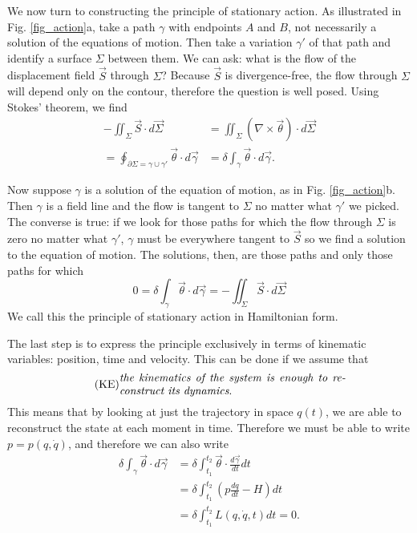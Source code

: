 \documentclass[fleqn,10pt]{wlscirep}
\begin{document}
We now turn to constructing the principle of stationary action. As illustrated in Fig. \ref{fig_action}a, take a path $\gamma$ with endpoints $A$ and $B$, not necessarily a solution of the equations of motion. Then take a variation $\gamma'$ of that path and identify a surface $\Sigma$ between them. We can ask: what is the flow of the displacement field $\vec{S}$ through $\Sigma$? Because $\vec{S}$ is divergence-free, the flow through $\Sigma$ will depend only on the contour, therefore the question is well posed. Using Stokes' theorem, we find
\begin{equation}\label{sdof_action}
\begin{aligned}
	- \iint_{\Sigma} \vec{S} \cdot d\vec{\Sigma} &= \iint_{\Sigma} \left( \nabla \times \vec{\theta} \right) \cdot d\vec{\Sigma} \\
	=  \oint_{\partial \Sigma = \gamma \cup \gamma'} \vec{\theta}  \cdot d\vec{\gamma} 
	&= \delta \int_{\gamma} \vec{\theta} \cdot d\vec{\gamma}.
\end{aligned}
\end{equation}

Now suppose $\gamma$ is a solution of the equation of motion, as in Fig. \ref{fig_action}b. Then $\gamma$ is a field line and the flow is tangent to $\Sigma$ no matter what $\gamma'$ we picked. The converse is true: if we look for those paths for which the flow through $\Sigma$ is zero no matter what $\gamma'$, $\gamma$ must be everywhere tangent to $\vec{S}$ so we find a solution to the equation of motion. The solutions, then, are those paths and only those paths for which
\begin{equation}\label{sdof_stationary_action}
	0 =\delta \int_{\gamma} \vec{\theta} \cdot d\vec{\gamma} = - \iint_{\Sigma} \vec{S} \cdot d\vec{\Sigma} 
\end{equation}
We call this the principle of stationary action in Hamiltonian form.

The last step is to express the principle exclusively in terms of kinematic variables: position, time and velocity. This can be done if we assume that 
\begin{align}\label{assum_kineq}
	\tag*{(KE)}
	\parbox{2.8in}{\emph{the kinematics of the system is enough to reconstruct its dynamics}.}
\end{align}
This means that by looking at just the trajectory in space $q(t)$, we are able to reconstruct the state at each moment in time. Therefore we must be able to write $p=p(q,\dot{q})$, and therefore we can also write
\begin{equation}\label{sdof_Lagrangian}
	\begin{aligned}
		\delta \int_{\gamma} \vec{\theta} \cdot d\vec{\gamma} 
		&= \delta \int^{t_2}_{t_1} \vec{\theta} \cdot \frac{d\vec{\gamma}}{dt} dt \\  
		&= \delta \int^{t_2}_{t_1} \left(p \frac{dq}{dt} - H \right) dt \\
		&= \delta \int^{t_2}_{t_1}L(q, \dot{q}, t) dt = 0.
	\end{aligned}
\end{equation}
\end{document}

